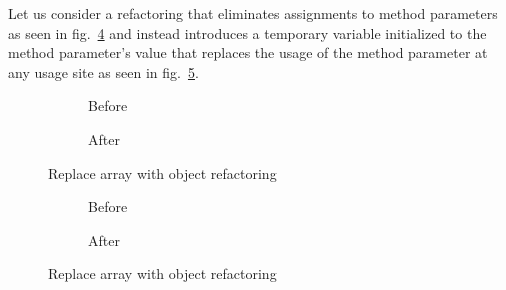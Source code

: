         Let us consider a refactoring that eliminates assignments to method parameters as seen in fig.~\ref{refa:RemoveAssignment-before} and instead introduces a temporary variable initialized to the method parameter's value that replaces the usage of the method parameter at any usage site as seen in fig.~\ref{refa:RemoveAssignment-after}.

\begin{figure}
  \begin{subfigure}[h]{.45\linewidth}
    
    \caption{Before}
    \label{refa:RemoveAssignment-before}    
  \end{subfigure}\hspace{1cm}
  \begin{subfigure}[h]{.45\linewidth}
    
    \caption{After}
    \label{refa:RemoveAssignment-after}
  \end{subfigure}
  \caption{Replace array with object refactoring}
  \label{refa:RemovAssignment}
\end{figure}


\begin{figure}
  \begin{subfigure}[h]{.45\linewidth}
    
    \caption{Before}
    \label{refa:RemoveAssignment-before}    
  \end{subfigure}\hspace{1cm}
  \begin{subfigure}[h]{.45\linewidth}
    
    \caption{After}
    \label{refa:RemoveAssignment-after}
  \end{subfigure}
  \caption{Replace array with object refactoring}
  \label{refa:RemovAssignment}
\end{figure}
